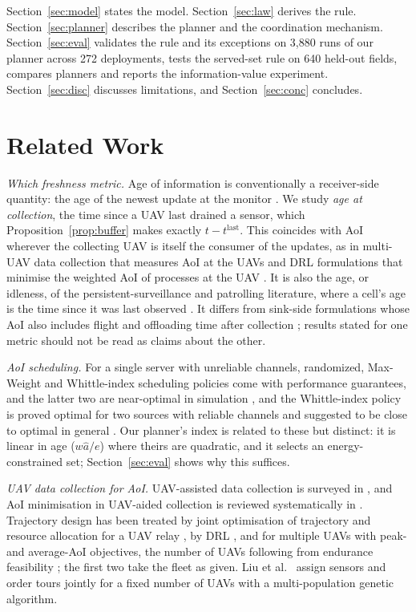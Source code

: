 \documentclass[journal,outdir=./]{IEEEtran}
\begin{document}
Section~\ref{sec:model} states the model. Section~\ref{sec:law} derives the rule. Section~\ref{sec:planner} describes the planner and the coordination mechanism. Section~\ref{sec:eval} validates the rule and its exceptions on 3{,}880 runs of our planner across 272 deployments, tests the served-set rule on 640 held-out fields, compares planners and reports the information-value experiment. Section~\ref{sec:disc} discusses limitations, and Section~\ref{sec:conc} concludes.

\section{Related Work}\label{sec:related}

\textit{Which freshness metric.} Age of information is conventionally a receiver-side quantity: the age of the newest update at the monitor \cite{yates2021aoi}. We study \emph{age at collection}, the time since a UAV last drained a sensor, which Proposition~\ref{prop:buffer} makes exactly $t-t^{\mathrm{last}}$. This coincides with AoI wherever the collecting UAV is itself the consumer of the updates, as in multi-UAV data collection that measures AoI at the UAVs \cite{wang2023cooperative} and DRL formulations that minimise the weighted AoI of processes at the UAV \cite{abdelmagid2019drl}. It is also the age, or idleness, of the persistent-surveillance and patrolling literature, where a cell's age is the time since it was last observed \cite{nigam2014review}. It differs from sink-side formulations whose AoI also includes flight and offloading time after collection \cite{gao2023aoi}; results stated for one metric should not be read as claims about the other.

\textit{AoI scheduling.} For a single server with unreliable channels, randomized, Max-Weight and Whittle-index scheduling policies come with performance guarantees, and the latter two are near-optimal in simulation \cite{kadota2018scheduling}, and the Whittle-index policy is proved optimal for two sources with reliable channels and suggested to be close to optimal in general \cite{tripathi2019whittle}. Our planner's index is related to these but distinct: it is linear in age ($w\hat a/e$) where theirs are quadratic, and it selects an energy-constrained set; Section~\ref{sec:eval} shows why this suffices.

\textit{UAV data collection for AoI.} UAV-assisted data collection is surveyed in \cite{wei2022survey,mozaffari2019tutorial}, and AoI minimisation in UAV-aided collection is reviewed systematically in \cite{amodu2023review}. Trajectory design has been treated by joint optimisation of trajectory and resource allocation for a UAV relay \cite{abdelmagid2019peak}, by DRL \cite{abdelmagid2019drl}, and for multiple UAVs with peak- and average-AoI objectives, the number of UAVs following from endurance feasibility \cite{gao2023aoi}; the first two take the fleet as given. Liu et al.\ \cite{liu2022aoi} assign sensors and order tours jointly for a fixed number of UAVs with a multi-population genetic algorithm.
\end{document}
